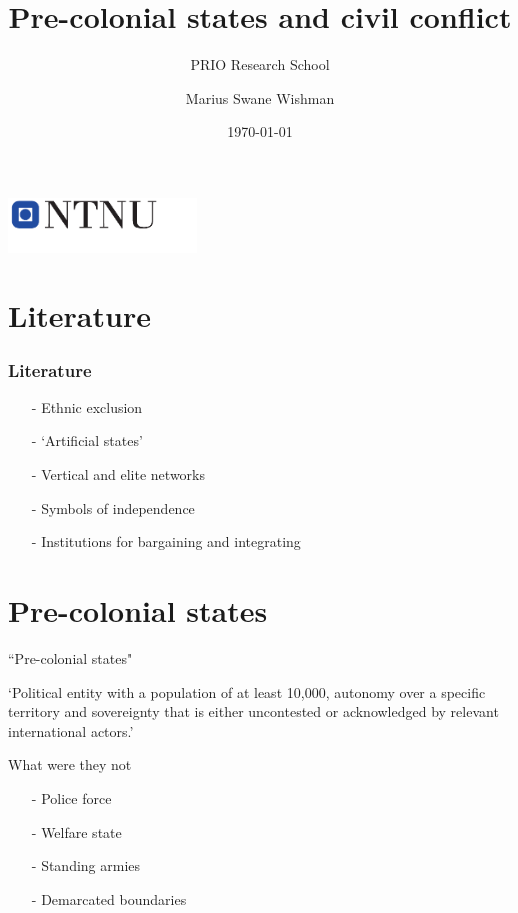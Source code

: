 \documentclass{beamer}
\title[]{Pre-colonial states and civil conflict}
\subtitle{PRIO Research School}
\author[Wishman]{Marius Swane Wishman}
\date{\today}
\institute{ISS}
\begin{document}
\begin{frame}[plain]
\titlepage 
\centering
\includegraphics[width=5cm]{img/logo_ntnu_u-slagord.pdf} 


\end{frame}

\section{Literature} 

\begin{frame}
\frametitle{Literature}
	
\begin{itemize}
	\item[-] Ethnic exclusion \citep{Paine2019}\pause
	\item[-] `Artificial states' \citep{Alesina2011, Englebert2002}\pause
	\item[-] Vertical and elite networks \pause
	\item[-] Symbols of independence \pause
	\item[-] Institutions for bargaining and integrating
		\citep{Depetris-Chauvin2016, Wig2016}
\end{itemize}

\end{frame}

\section{Pre-colonial states}

\begin{frame}{``Pre-colonial states"}

 `Political entity with a population of at least 10,000, autonomy over a
 specific territory and sovereignty that is either uncontested or acknowledged
 by relevant international actors.' \citep{Butcher2020}

\end{frame}

\begin{frame}{What were they not}

\begin{itemize}
	\item[-] Police force \pause
	\item[-] Welfare state \pause
	\item[-] Standing armies \pause
	\item[-] Demarcated boundaries
\end{itemize}	

\end{frame}
\end{document}
